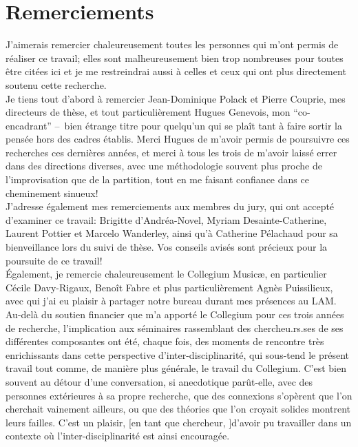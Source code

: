 %
\chapter*{Remerciements}
\label{sec:acknowledgement}
\vspace*{-10mm}


J'aimerais remercier chaleureusement toutes les personnes qui m'ont permis de réaliser ce travail; elles sont malheureusement bien trop nombreuses pour toutes être citées ici et je me restreindrai aussi à celles et ceux qui ont plus directement soutenu cette recherche.\\
\indent Je tiens tout d'abord à remercier Jean-Dominique Polack et Pierre Couprie, mes directeurs de thèse, et tout particulièrement Hugues Genevois, mon ``co-encadrant'' --~bien étrange titre pour quelqu'un qui se plaît tant à faire sortir la pensée hors des cadres établis. Merci Hugues de m'avoir permis de poursuivre ces recherches ces dernières années, et merci à tous les trois de m'avoir laissé errer dans des directions diverses, avec une méthodologie souvent plus proche de l'improvisation que de la partition, tout en me faisant confiance dans ce cheminement sinueux!\\
\indent J'adresse également mes remerciements aux membres du jury, qui ont accepté d'examiner ce travail: Brigitte d'Andréa-Novel, Myriam Desainte-Catherine, Laurent Pottier et Marcelo Wanderley, ainsi qu'à Catherine Pélachaud pour sa bienveillance lors du suivi de thèse. Vos conseils avisés sont précieux pour la poursuite de ce travail!\\
\indent Également, je remercie chaleureusement le Collegium Musicæ, en particulier Cécile Davy-Rigaux, Benoît Fabre et plus particulièrement Agnès Puissilieux, avec qui j'ai eu plaisir à partager notre bureau durant mes présences au LAM. Au-delà du soutien financier que m'a apporté le Collegium pour ces trois années de recherche, l'implication aux séminaires rassemblant des chercheu.rs.ses de ses différentes composantes ont été, chaque fois, des moments de rencontre très enrichissants dans cette perspective d'inter-disciplinarité, qui sous-tend le présent travail tout comme, de manière plus générale, le travail du Collegium. C'est bien souvent au détour d'une conversation, si anecdotique parût-elle, avec des personnes extérieures à sa propre recherche, que des connexions s'opèrent que l'on cherchait vainement ailleurs, ou que des théories que l'on croyait solides montrent leurs failles. C'est un plaisir, [en tant que chercheur, ]d'avoir pu travailler dans un contexte où l'inter-disciplinarité est ainsi encouragée.\\
